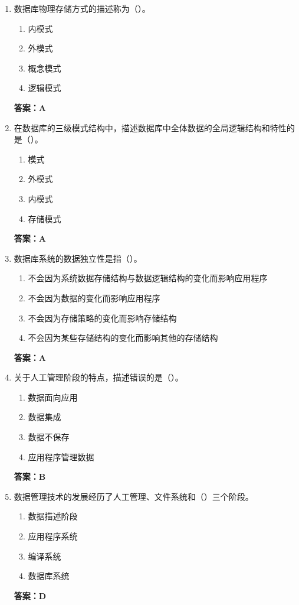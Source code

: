 \documentclass[12pt, a4paper]{article}
\begin{document}
\begin{enumerate}[label=\arabic*.]
	\item 数据库物理存储方式的描述称为（\quad）。
	      \begin{enumerate}
		      \item 内模式
		      \item 外模式
		      \item 概念模式
		      \item 逻辑模式
	      \end{enumerate}
	      \textbf{答案：A}

	\item 在数据库的三级模式结构中，描述数据库中全体数据的全局逻辑结构和特性的是（\quad）。
	      \begin{enumerate}
		      \item 模式
		      \item 外模式
		      \item 内模式
		      \item 存储模式
	      \end{enumerate}
	      \textbf{答案：A}

	\item 数据库系统的数据独立性是指（\quad）。
	      \begin{enumerate}
		      \item 不会因为系统数据存储结构与数据逻辑结构的变化而影响应用程序
		      \item 不会因为数据的变化而影响应用程序
		      \item 不会因为存储策略的变化而影响存储结构
		      \item 不会因为某些存储结构的变化而影响其他的存储结构
	      \end{enumerate}
	      \textbf{答案：A}

	\item 关于人工管理阶段的特点，描述错误的是（\quad）。
	      \begin{enumerate}
		      \item 数据面向应用
		      \item 数据集成
		      \item 数据不保存
		      \item 应用程序管理数据
	      \end{enumerate}
	      \textbf{答案：B}

	\item 数据管理技术的发展经历了人工管理、文件系统和（\quad）三个阶段。
	      \begin{enumerate}
		      \item 数据描述阶段
		      \item 应用程序系统
		      \item 编译系统
		      \item 数据库系统
	      \end{enumerate}
	      \textbf{答案：D}


\end{enumerate}
\end{document}
